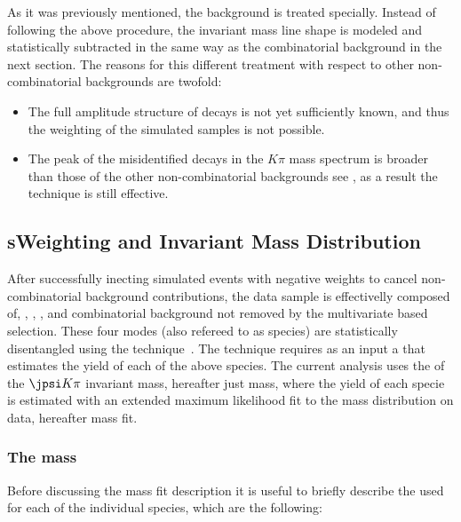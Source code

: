 As it was previously mentioned, the \LbJpsippi background is treated specially. Instead of following the above
procedure, the \LbJpsippi invariant mass line shape is modeled and statistically subtracted in the same way as the
combinatorial background in the next section. The reasons for this different treatment with respect to other
non-combinatorial backgrounds are twofold:
\begin{itemize}
\item The full amplitude structure of \LbJpsippi decays is not yet sufficiently known, and thus the weighting of the simulated samples is not possible.
\item The peak of the misidentified \LbJpsippi decays in the \jpsi$K\pi$ mass spectrum is broader than those of the other
      non-combinatorial backgrounds see , as a result the \sPlot technique is still effective.
\end{itemize}

\subsection{sWeighting and Invariant Mass Distribution}
\label{sWeighting_and_mass}

After successfully inecting simulated events with negative weights to cancel non-combinatorial background contributions,
the data sample is effectivelly composed of, \BdJpsiKpi, \BsJpsiKpi, \LbJpsippi, and combinatorial background not removed by the
multivariate based selection. These four modes (also refereed to as species) are statistically
disentangled using the \sPlot technique~\cite{splot}. The technique requires as an input a \pdf that estimates the yield of each
of the above species. The current analysis uses the \pdf of the $\jpsi K\pi$ invariant mass, hereafter just mass, where the yield of each specie
is estimated with an extended maximum likelihood fit to the mass distribution on data, hereafter mass fit.

\subsubsection{The mass \pdf}
Before discussing the mass fit description it is useful to briefly describe the \pdfs used for each of the individual species, which are the following:

